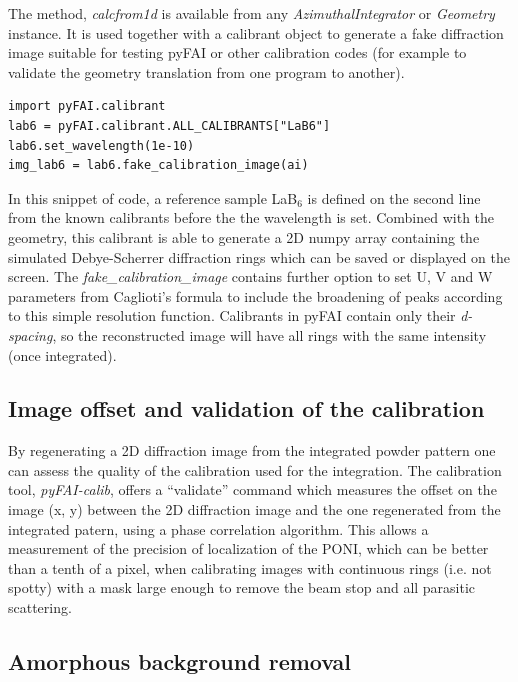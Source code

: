 \documentclass[preprint]{iucr}
\begin{document}
The method, \textit{calcfrom1d} is available from any
\textit{AzimuthalIntegrator} or \textit{Geometry} instance.
It is used together with a calibrant object to generate a fake diffraction image
suitable for testing pyFAI or other calibration codes (for example to validate
the geometry translation from one program to another).


\begin{verbatim}
import pyFAI.calibrant
lab6 = pyFAI.calibrant.ALL_CALIBRANTS["LaB6"]
lab6.set_wavelength(1e-10)
img_lab6 = lab6.fake_calibration_image(ai)
\end{verbatim}

In this snippet of code, a reference sample LaB$_6$ is defined on the second
line from the known calibrants before the the wavelength is set.
Combined with the geometry, this calibrant is able to
generate a 2D numpy array containing the simulated Debye-Scherrer diffraction
rings which can be saved or displayed on the screen.
The \textit{fake\_calibration\_image} contains further option to set U, V and W
parameters from Caglioti's formula \cite{caglioti} to include the
broadening of peaks according to this simple resolution function.
Calibrants in pyFAI contain only their \textit{d-spacing}, so the
reconstructed image will have all rings with the same
intensity (once integrated).

\subsection{Image offset and validation of the calibration}
By regenerating a 2D diffraction image from the integrated powder pattern one
can assess the quality of the calibration used for the integration.
The calibration tool, \textit{pyFAI-calib}, offers  a ``validate'' command which
measures the offset on the image (x, y) between the 2D diffraction image and the
one regenerated from the integrated patern, using a phase correlation
algorithm.
This allows a measurement of the precision of localization of the PONI, which
can be better than a tenth of a pixel, when calibrating images with continuous
rings (i.e. not spotty) with a mask large enough to remove the beam stop and
all parasitic scattering.

\subsection{Amorphous background removal}
\end{document}
